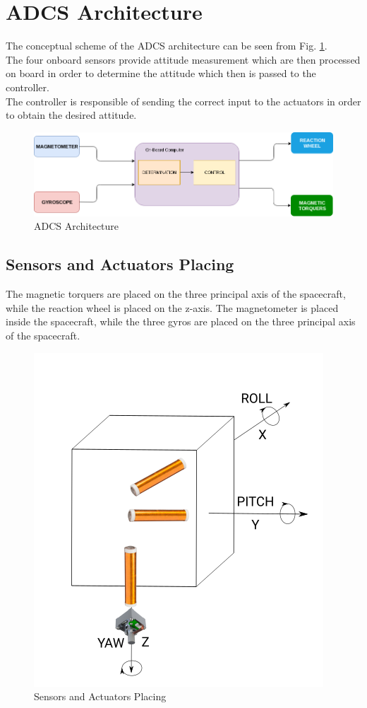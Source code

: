 \documentclass[11pt,a4paper]{report}
\begin{document}
\newpage

\section{ADCS Architecture}
The conceptual scheme of the ADCS architecture can be seen from Fig. \ref{fig:architecture}.\\
The four onboard sensors provide attitude measurement which are then processed on board in order to determine the attitude which then is passed to the controller.\\
The controller is responsible of sending the correct input to the actuators in order to obtain the desired attitude.

\begin{figure}[H]
 	\centering
 	\includegraphics[scale=0.5]{gfx/adcs.png}
    \caption{ADCS Architecture}
    \label{fig:architecture}
\end{figure}

\subsection{Sensors and Actuators Placing}
The magnetic torquers are placed on the three principal axis of the spacecraft, while the reaction wheel is placed on the z-axis. The magnetometer is placed inside the spacecraft, while the three gyros are placed on the three principal axis of the spacecraft.

\begin{figure}[H]
 	\centering
 	\includegraphics[scale=0.4]{gfx/actuators.png}
    \caption{Sensors and Actuators Placing}
\end{figure}
\end{document}
